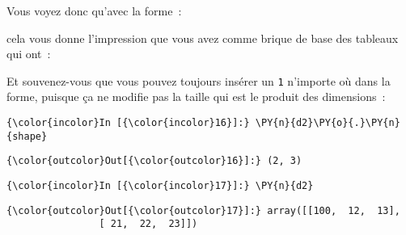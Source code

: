     Vous voyez donc qu'avec la forme~:

\begin{Shaded}
\begin{Highlighting}[frame=lines,framerule=0.6mm,rulecolor=\color{asisframecolor}]
\NormalTok{, }\NormalTok{, }\NormalTok{, }
\end{Highlighting}
\end{Shaded}

cela vous donne l'impression que vous avez comme brique de base des
tableaux qui ont~:

\begin{Shaded}
\begin{Highlighting}[frame=lines,framerule=0.6mm,rulecolor=\color{asisframecolor}]
\end{Highlighting}
\end{Shaded}

    Et souvenez-vous que vous pouvez toujours insérer un \texttt{1}
n'importe où dans la forme, puisque ça ne modifie pas la taille qui est
le produit des dimensions~:

    \begin{Verbatim}[commandchars=\\\{\},frame=single,framerule=0.3mm,rulecolor=\color{cellframecolor}]
{\color{incolor}In [{\color{incolor}16}]:} \PY{n}{d2}\PY{o}{.}\PY{n}{shape}
\end{Verbatim}


\begin{Verbatim}[commandchars=\\\{\},frame=single,framerule=0.3mm,rulecolor=\color{cellframecolor}]
{\color{outcolor}Out[{\color{outcolor}16}]:} (2, 3)
\end{Verbatim}
            
    \begin{Verbatim}[commandchars=\\\{\},frame=single,framerule=0.3mm,rulecolor=\color{cellframecolor}]
{\color{incolor}In [{\color{incolor}17}]:} \PY{n}{d2}
\end{Verbatim}


\begin{Verbatim}[commandchars=\\\{\},frame=single,framerule=0.3mm,rulecolor=\color{cellframecolor}]
{\color{outcolor}Out[{\color{outcolor}17}]:} array([[100,  12,  13],
                [ 21,  22,  23]])
\end{Verbatim}
            
